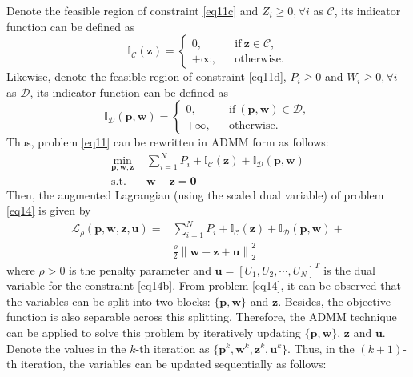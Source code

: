 \documentclass[journal]{IEEEtran}
\begin{document}
Denote the feasible region of constraint \eqref{eq11c} and $Z_i \geq 0, \forall i$ as $\mathcal{C}$, its indicator function can be defined as
\begin{equation}
\mathbb{I}_\mathcal{C}\left(\mathbf{z}\right) = \left\{ \begin{array}{lcl}
0, & &\mbox{if} \ \mathbf{z} \in \mathcal{C}, \\
+\infty, & &\mbox{otherwise}.
\end{array}
\right.
\end{equation}
Likewise, denote the feasible region of constraint \eqref{eq11d}, $P_i\geq 0$ and $W_i \geq 0, \forall i$ as $\mathcal{D}$, its indicator function can be defined as
\begin{equation}
\mathbb{I}_\mathcal{D}\left(\mathbf{p},\mathbf{w}\right) = \left\{ \begin{array}{lcl}
0, & &\mbox{if} \ \left(\mathbf{p}, \mathbf{w}\right) \in \mathcal{D}, \\
+\infty, & &\mbox{otherwise}.
\end{array}
\right.
\end{equation}
Thus, problem \eqref{eq11} can be rewritten in ADMM form as follows:
\begin{subequations}\label{eq14}
	\begin{align}
	\min_{\mathbf{p}, \mathbf{w}, \mathbf{z}}\ & \sum\limits_{i = 1}^{N} P_i + \mathbb{I}_\mathcal{C}\left(\mathbf{z}\right) + \mathbb{I}_\mathcal{D}\left(\mathbf{p},\mathbf{w}\right)  \label{eq14a} \\ \mbox{s.t.} \quad &  \mathbf{w} - \mathbf{z} = \mathbf{0} \label{eq14b}
	\end{align}
\end{subequations}
Then, the augmented Lagrangian (using the scaled dual variable) of problem \eqref{eq14} is given by
\begin{align}
\mathcal{L}_\rho\left(\mathbf{p},\mathbf{w}, \mathbf{z},\mathbf{u}\right) = & \sum\limits_{i = 1}^{N} P_i + \mathbb{I}_\mathcal{C}\left(\mathbf{z}\right) + \mathbb{I}_\mathcal{D}\left(\mathbf{p},\mathbf{w}\right) + \\ & \frac{\rho}{2}\left\|\mathbf{w} - \mathbf{z} + \mathbf{u}\right\|_2^2
\end{align}
where $\rho > 0$ is the penalty parameter and $\mathbf{u} = [U_1, U_2, \cdots, U_N]^T$ is the dual variable for the  constraint \eqref{eq14b}. From problem \eqref{eq14}, it can be observed that the variables can be split into two blocks: $\{\mathbf{p}, \mathbf{w}\}$ and $\mathbf{z}$. Besides, the objective function is also separable across this splitting. Therefore, the ADMM technique can be applied to solve this problem by iteratively updating $\{\mathbf{p}, \mathbf{w}\}$, $\mathbf{z}$ and $\mathbf{u}$. Denote the values in the $k$-th iteration as $\{\mathbf{p}^k, \mathbf{w}^k, \mathbf{z}^k, \mathbf{u}^k\}$. Thus, in the $(k+1)$-th iteration, the variables can be updated sequentially as follows:
 
\end{document}
